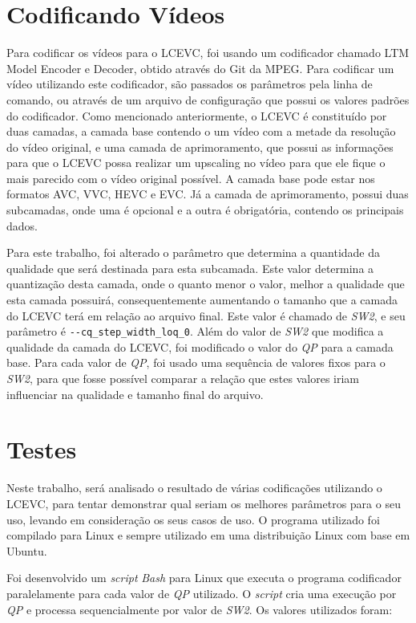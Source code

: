 \section{Codificando Vídeos}

Para codificar os vídeos para o \acrshort{LCEVC}, foi usando um codificador chamado
LTM Model Encoder e Decoder, obtido através do Git da MPEG. Para codificar um vídeo utilizando
este codificador, são passados os parâmetros pela linha de comando, ou
através de um arquivo de configuração que possui os valores padrões do
codificador. Como mencionado anteriormente, o \acrshort{LCEVC} é constituído por
duas camadas, a camada base contendo o um vídeo com a metade da resolução
do vídeo original, e uma camada de aprimoramento, que possui as informações
para que o \acrshort{LCEVC} possa realizar um upscaling no vídeo para que ele fique
o mais parecido com o vídeo original possível. A camada base pode estar
nos formatos AVC, VVC, HEVC e EVC. Já a camada de aprimoramento, possui
duas subcamadas, onde uma é opcional e a outra é obrigatória, contendo
os principais dados.

Para este trabalho, foi alterado o parâmetro que determina
a quantidade da qualidade que será destinada para esta subcamada. Este
valor determina a quantização desta camada, onde o quanto menor o valor,
melhor a qualidade que esta camada possuirá, consequentemente aumentando
o tamanho que a camada do \acrshort{LCEVC} terá em relação ao arquivo final. Este
valor é chamado de \textit{SW2}, e seu parâmetro é 
\texttt{-{}-cq\_step\_width\_loq\_0}. Além do valor de \textit{SW2} que
modifica a qualidade da camada do \acrshort{LCEVC}, foi modificado o valor do \textit{QP}
para a camada base. Para cada valor de \textit{QP}, foi usado uma sequência 
de valores fixos para o \textit{SW2}, para que fosse possível comparar a
relação que estes valores iriam influenciar na qualidade e tamanho final
do arquivo.
 
\section{Testes}

Neste trabalho, será analisado o resultado de várias codificações utilizando o
\acrshort{LCEVC}, para tentar demonstrar qual seriam os melhores parâmetros para o seu uso,
levando em consideração os seus casos de uso. O programa utilizado foi compilado
para Linux e sempre utilizado em uma distribuição Linux com base em Ubuntu.

Foi desenvolvido um \textit{script} \textit{Bash} para Linux que executa o programa codificador
paralelamente para cada valor de \textit{QP} utilizado. O \textit{script} cria uma execução por
\textit{QP} e processa sequencialmente por valor de \textit{SW2}. Os valores utilizados
foram:

